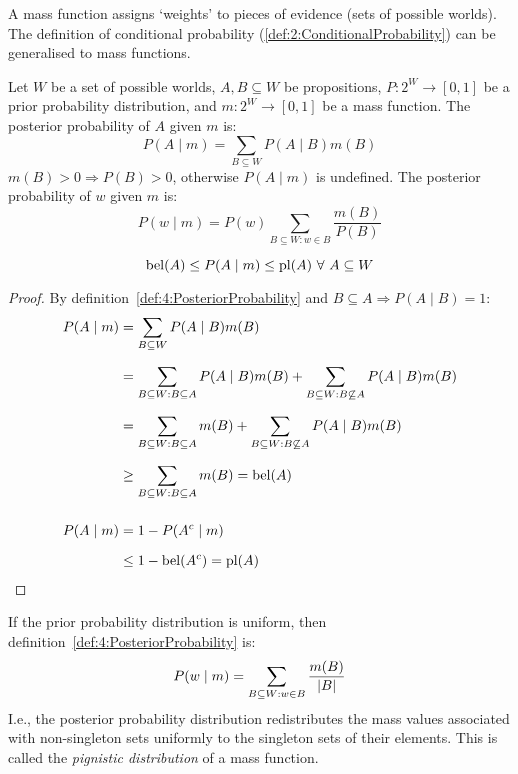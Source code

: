A mass function assigns `weights' to pieces of evidence (sets of possible worlds).
The definition of conditional probability (\ref{def:2:ConditionalProbability})
can be generalised to mass functions.

\begin{dfn}
  \label{def:4:PosteriorProbability}
  Let $W$ be a set of possible worlds, $A, B \subseteq W$ be propositions,
  $P : 2^W \rightarrow [0, 1]$ be a prior probability distribution, and
  $m : 2^W \rightarrow [0, 1]$ be a mass function.
  The posterior probability of $A$ given $m$ is:
  \begin{equation}
    P(A \mid m) = \sum_{B \subseteq W} P(A \mid B) m(B)
  \end{equation}
  $m(B) > 0 \Rightarrow P(B) > 0$, otherwise $P(A \mid m)$ is undefined.
  The posterior probability of $w$ given $m$ is:
  \begin{equation}
    P(w \mid m) = P(w) \sum_{B \subseteq W : w \in B} \frac{m(B)}{P(B)}
  \end{equation}
\end{dfn}

\begin{thm}
  \begin{equation}
    \bel(A) \leq P(A \mid m) \leq \pl(A) \ \forall\ A \subseteq W
  \end{equation}
  \begin{proof}
    By definition~\ref{def:4:PosteriorProbability} and
    $B \subseteq A \Rightarrow P(A \mid B) = 1$:
    \begin{align*}
      P(A \mid m)
       & = \sum_{B \subseteq W} P(A \mid B) m(B)                  \\[1.5ex]
       & = \sum_{B \subseteq W : B \subseteq A} P(A \mid B) m(B)
      + \sum_{B \subseteq W : B \not\subseteq A} P(A \mid B) m(B) \\[1.5ex]
       & = \sum_{B \subseteq W : B \subseteq A} m(B)
      + \sum_{B \subseteq W : B \not\subseteq A} P(A \mid B) m(B) \\[1.5ex]
       & \geq \sum_{B \subseteq W : B \subseteq A} m(B) = \operatorname*{bel}(A) \\[3ex]
      P(A \mid m)
       & = 1 - P(A^c \mid m)                                      \\[1.5ex]
       & \leq 1 - \operatorname*{bel}(A^c) = \operatorname*{pl}(A)
    \end{align*}
  \end{proof}
\end{thm}

If the prior probability distribution is uniform, then
definition~\ref{def:4:PosteriorProbability} is:
\begin{equation*}
  P(w \mid m) = \sum_{B \subseteq W : w \in B} \frac{m(B)}{|B|}
\end{equation*}
I.e., the posterior probability distribution redistributes the mass values
associated with non-singleton sets uniformly to the singleton sets of their
elements.
This is called the \textit{pignistic distribution} of a mass function.